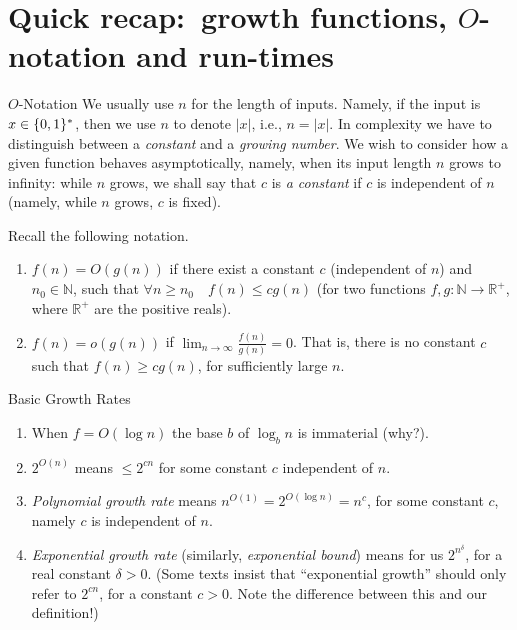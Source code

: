 \section{Quick recap:\ growth functions, $O$-notation and run-times}



\begin{trailer}{$O$-Notation}
    We usually use $n$ for the length of inputs. Namely, if the input is $x\in\{0,1\}^*$, then we use $n$ to denote $|x|$, i.e., $n=|x|$. In complexity we have to distinguish between a \emph{constant} and a \emph{growing number}. We wish to consider how a given function behaves asymptotically, namely, when its input length $n$ grows to infinity: while $n$ grows, we shall say that $c$ is \emph{a constant} if $c$ is independent of $n$ (namely, while $n$ grows, $c$ is fixed).  


Recall the following notation.
\begin{enumerate}
    \item 
 $f(n)=O(g(n))$ if there exist a constant $c$ (independent of $n$) and $n_0 \in \mathbb{N}$, such that  $\forall n \geq n_0 \quad f(n) \leq c g(n) $ (for two functions  $f, g: \mathbb{N} \rightarrow \mathbb{R}^{+}$, where $\mathbb R ^+$ are the positive reals).

\item $f(n)=o(g(n))$ if $\lim _{n \rightarrow \infty} \frac{f(n)}{g(n)}=0$. That is, there is no constant $c$ such that $f(n)\ge cg(n)$, for sufficiently large $n$.
\end{enumerate}
\end{trailer}

\begin{trailer}{Basic Growth Rates}
\begin{enumerate}
    \item When $f=O\left(\log n\right)$ the base $b$ of $\log _b n$ is immaterial (why?).
    
    \item $2^{O(n)}$ means $\leq 2^{c n}$ for some constant $c$ independent of $n$.

    \item \emph{Polynomial growth rate} means $n^{O(1)}=2^{O\left(\log n\right)}=n^c$, for some constant $c$, namely $c$ is independent of $n$.
    \item \emph{Exponential growth rate} (similarly, \emph{exponential bound})  means for us $2^{n^\delta}$, for a real constant $\delta>0$. (Some texts insist that ``exponential growth'' should only refer to $2^{cn}$, for a constant $c>0$. Note the difference between this and our definition!)
\end{enumerate}
\end{trailer}




